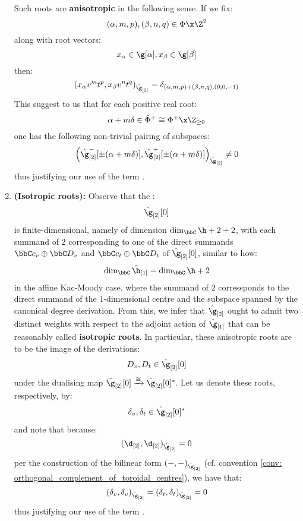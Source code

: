 \begin{remark}
\begin{enumerate}
                Such roots are \textbf{anisotropic} in the following sense. If we fix:
                    $$(\alpha, m, p), (\beta, n, q) \in \Phi \x \Z^2$$
                along with root vectors:
                    $$x_{\alpha} \in \g[\alpha], x_{\beta} \in \g[\beta]$$
                then:
                    $$( x_{\alpha} v^m t^p, x_{\beta} v^n t^q )_{\hat{\g}_{[2]}} = \delta_{(\alpha, m, p) + (\beta, n, q), (0, 0, -1)}$$
                This suggest to us that for each positive real root:
                    $$\alpha + m\delta \in \hat{\Phi}^+ \cong \Phi^+ \x \Z_{\geq 0}$$
                one has the following non-trivial pairing of subspaces:
                    $$\left( \hat{\g}_{[2]}^-[\pm (\alpha + m\delta)], \hat{\g}_{[2]}^+[\pm (\alpha + m\delta)] \right)_{\hat{\g}_{[2]}} \not = 0$$
                thus justifying our use of the term .
                \item \textbf{(Isotropic roots):} Observe that the :
                    $$\hat{\g}_{[2]}[0]$$
                is finite-dimensional, namely of dimension $\dim_{\bbC} \h + 2 + 2$, with each summand of $2$ corresponding to one of the direct summands $\bbC c_v \oplus \bbC D_v$ and $\bbC c_t \oplus \bbC D_t$ of $\hat{\g}_{[2]}[0]$, similar to how:
                    $$\dim_{\bbC} \hat{\h}_{[1]} = \dim_{\bbC} \h + 2$$
                in the affine Kac-Moody case, where the summand of $2$ corressponds to the direct summand of the $1$-dimensional centre and the subspace spanned by the canonical degree derivation. From this, we infer that $\hat{\g}_{[2]}$ ought to admit two distinct weights with respect to the adjoint action of $\hat{\g}_{[1]}$ that can be reasonably called \textbf{isotropic roots}. In particular, these anisotropic roots are to be the image of the derivations:
                    $$D_v, D_t \in \hat{\g}_{[2]}[0]$$
                under the dualising map $\hat{\g}_{[2]}[0] \xrightarrow[]{\cong} \hat{\g}_{[2]}[0]^*$. Let us denote these roots, respectively, by:
                    $$\delta_v, \delta_t \in \hat{\g}_{[2]}[0]^*$$
                and note that because:
                    $$(\d_{[2]}, \d_{[2]})_{\hat{\g}_{[2]}} = 0$$
                per the construction of the bilinear form $(-, -)_{\hat{\g}_{[2]}}$ (cf. convention \ref{conv: orthogonal_complement_of_toroidal_centres}), we have that:
                    $$(\delta_v, \delta_v)_{\hat{\g}_{[2]}} = (\delta_t, \delta_t)_{\hat{\g}_{[2]}} = 0$$
                thus justifying our use of the term .


\end{enumerate}
\end{remark}
